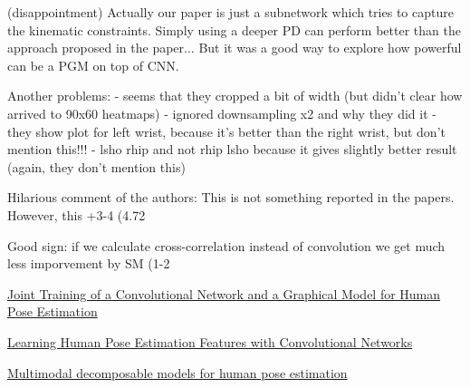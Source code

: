 \documentclass[a4paper,11pt]{article}
\begin{document}
    (disappointment) Actually our paper is just a subnetwork which tries to capture the kinematic constraints.
    Simply using a deeper PD can perform better than the approach proposed in the paper...
    But it was a good way to explore how powerful can be a PGM on top of CNN.

    Another problems:
    - seems that they cropped a bit of width (but didn't clear how arrived to 90x60 heatmaps)
    - ignored downsampling x2 and why they did it
    - they show plot for left wrist, because it's better than the right wrist, but don't mention this!!!
    - lsho rhip and not rhip lsho because it gives slightly better result (again, they don't mention this)


    Hilarious comment of the authors:
    This is not something reported in the papers. However, this +3-4%
    (4.72%


    Good sign: if we calculate cross-correlation instead of convolution we get much less imporvement by SM (1-2%
\newpage
	\begin{thebibliography}{}
		\href{https://arxiv.org/abs/1406.2984}
		{Joint Training of a Convolutional Network and a Graphical Model for Human Pose Estimation}

		\href{https://arxiv.org/abs/1312.7302}
		{Learning Human Pose Estimation Features with Convolutional Networks}

		\href{https://homes.cs.washington.edu/~taskar/pubs/modec_cvpr13.pdf}
		{Multimodal decomposable models for human pose estimation}
	\end{thebibliography}
\newpage
\end{document}
